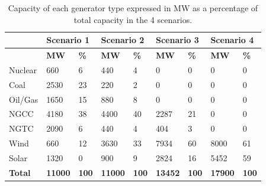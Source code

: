\documentclass[12pt,LUDisStyle,twosided]{book}
\begin{document}
\begin{table}[H]
\centering
\caption{Capacity of each generator type expressed in MW as a percentage of total capacity in the 4 scenarios.}
\begin{tabular}{|lllllll|l|l|}
\hline
               & \multicolumn{2}{l}{\textbf{Scenario 1}} & \multicolumn{2}{l}{\textbf{Scenario 2}} & \multicolumn{2}{l|}{\textbf{Scenario 3}} & \multicolumn{2}{l|}{\textbf{Scenario 4}} \\ \hline
               & \textbf{MW}         & \textbf{\%}       & \textbf{MW}         & \textbf{\%}       & \textbf{MW}          & \textbf{\%}       & \textbf{MW}          & \textbf{\%}       \\ \hline
Nuclear        & 660                 & 6                 & 440                 & 4                 & 0                    & 0                 & 0                    & 0                 \\ \hline
Coal           & 2530                & 23                & 220                 & 2                 & 0                    & 0                 & 0                    & 0                 \\ \hline
Oil/Gas        & 1650                & 15                & 880                 & 8                 & 0                    & 0                 & 0                    & 0                 \\ \hline
NGCC           & 4180                & 38                & 4400                & 40                & 2287                 & 21                & 0                    & 0                 \\ \hline
NGTC           & 2090                & 6                 & 440                 & 4                 & 404                  & 3                 & 0                    & 0                 \\ \hline
Wind           & 660                 & 12                & 3630                & 33                & 7934                 & 60                & 8000                 & 61                \\ \hline
Solar          & 1320                & 0                 & 900                 & 9                 & 2824                 & 16                & 5452                 & 59                \\ \hline
\textbf{Total} & \textbf{11000}      & \textbf{100}      & \textbf{11000}      & \textbf{100}      & \textbf{13452}       & \textbf{100}      & \textbf{17900}       & \textbf{100}      \\ \hline
\end{tabular}
\label{table:ScenarioDataDescription}
\end{table}
\end{document}
